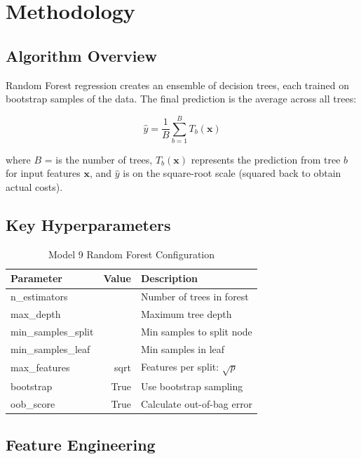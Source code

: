 \section{Methodology}

\subsection{Algorithm Overview}

Random Forest regression creates an ensemble of \ModelNineNTrees{} decision trees, each trained on bootstrap samples of the data. The final prediction is the average across all trees:

\begin{equation}
\hat{y} = \frac{1}{B} \sum_{b=1}^{B} T_b(\mathbf{x})
\end{equation}

where $B$ = \ModelNineNTrees{} is the number of trees, $T_b(\mathbf{x})$ represents the prediction from tree $b$ for input features $\mathbf{x}$, and $\hat{y}$ is on the square-root scale (squared back to obtain actual costs).

\subsection{Key Hyperparameters}

\begin{table}[h]
\centering
\caption{Model 9 Random Forest Configuration}
\begin{tabular}{lrl}
\toprule
\textbf{Parameter} & \textbf{Value} & \textbf{Description} \\
\midrule
n\_estimators & \ModelNineNTrees{} & Number of trees in forest \\
max\_depth & \ModelNineMaxDepth{} & Maximum tree depth \\
min\_samples\_split & \ModelNineMinSamplesSplit{} & Min samples to split node \\
min\_samples\_leaf & \ModelNineMinSamplesLeaf{} & Min samples in leaf \\
max\_features & sqrt & Features per split: $\sqrt{p}$ \\
bootstrap & True & Use bootstrap sampling \\
oob\_score & True & Calculate out-of-bag error \\
\bottomrule
\end{tabular}
\label{tab:model9_hyperparams}
\end{table}

\subsection{Feature Engineering}

